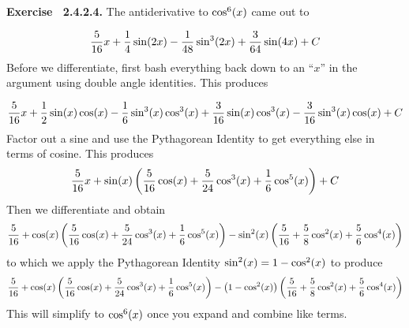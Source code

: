  {\noindent \protect \bf  Exercise ~2.4.2.4.} The antiderivative to $\protect \qopname  \relax o{cos}^6(x)$ came out to \par $$\protect \frac  {5}{16}x+\protect \frac  {1}{4}\protect \qopname  \relax o{sin}(2x)-\protect \frac  {1}{48}\protect \qopname  \relax o{sin}^3(2x)+\protect \frac  {3}{64}\protect \qopname  \relax o{sin}(4x)+C$$ Before we differentiate, first bash everything back down to an ``$x$'' in the argument using double angle identities. This produces \par $$\protect \frac  {5}{16}x+\protect \frac  {1}{2}\protect \qopname  \relax o{sin}(x)\protect \qopname  \relax o{cos}(x)-\protect \frac  {1}{6}\protect \qopname  \relax o{sin}^3(x)\protect \qopname  \relax o{cos}^3(x)+\protect \frac  {3}{16}\protect \qopname  \relax o{sin}(x)\protect \qopname  \relax o{cos}^3(x)-\protect \frac  {3}{16}\protect \qopname  \relax o{sin}^3(x)\protect \qopname  \relax o{cos}(x)+C$$ Factor out a sine and use the Pythagorean Identity to get everything else in terms of cosine. This produces $$\protect \frac  {5}{16}x+\protect \qopname  \relax o{sin}(x)\left (\protect \frac  {5}{16}\protect \qopname  \relax o{cos}(x)+\protect \frac  {5}{24}\protect \qopname  \relax o{cos}^3(x)+\protect \frac  {1}{6}\protect \qopname  \relax o{cos}^5(x)\right )+C$$ Then we differentiate and obtain $$\protect \frac  {5}{16}+\protect \qopname  \relax o{cos}(x)\left (\protect \frac  {5}{16}\protect \qopname  \relax o{cos}(x)+\protect \frac  {5}{24}\protect \qopname  \relax o{cos}^3(x)+\protect \frac  {1}{6}\protect \qopname  \relax o{cos}^5(x)\right )-\protect \qopname  \relax o{sin}^2(x)\left (\protect \frac  {5}{16}+\protect \frac  {5}{8}\protect \qopname  \relax o{cos}^2(x)+\protect \frac  {5}{6}\protect \qopname  \relax o{cos}^4(x)\right )$$ to which we apply the Pythagorean Identity $\protect \qopname  \relax o{sin}^2(x)=1-\protect \qopname  \relax o{cos}^2(x)$ to produce $$\protect \frac  {5}{16}+\protect \qopname  \relax o{cos}(x)\left (\protect \frac  {5}{16}\protect \qopname  \relax o{cos}(x)+\protect \frac  {5}{24}\protect \qopname  \relax o{cos}^3(x)+\protect \frac  {1}{6}\protect \qopname  \relax o{cos}^5(x)\right )-\left (1-\protect \qopname  \relax o{cos}^2(x)\right )\left (\protect \frac  {5}{16}+\protect \frac  {5}{8}\protect \qopname  \relax o{cos}^2(x)+\protect \frac  {5}{6}\protect \qopname  \relax o{cos}^4(x)\right )$$ This will simplify to $\protect \qopname  \relax o{cos}^6(x)$ once you expand and combine like terms.  \protect \newline  \protect \newline  
